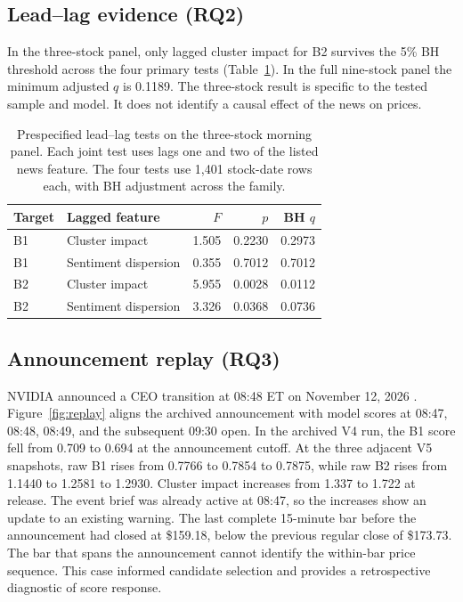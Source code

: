 \documentclass{article}
\begin{document}
\subsection{Lead--lag evidence (RQ2)}

In the three-stock panel, only lagged cluster impact for B2 survives the 5\% BH threshold across the four primary tests (Table~\ref{tab:granger}). In the full nine-stock panel the minimum adjusted $q$ is 0.1189. The three-stock result is specific to the tested sample and model. It does not identify a causal effect of the news on prices.

\begin{table}[htbp]
 \caption{Prespecified lead--lag tests on the three-stock morning panel. Each joint test uses lags one and two of the listed news feature. The four tests use 1,401 stock-date rows each, with BH adjustment across the family.}
 \label{tab:granger}
 \centering
 \begin{tabular}{@{}llrrr@{}}
 \toprule
 Target & Lagged feature & $F$ & $p$ & BH $q$ \\
 \midrule
 B1 & Cluster impact & 1.505 & 0.2230 & 0.2973 \\
 B1 & Sentiment dispersion & 0.355 & 0.7012 & 0.7012 \\
 B2 & Cluster impact & 5.955 & 0.0028 & 0.0112 \\
 B2 & Sentiment dispersion & 3.326 & 0.0368 & 0.0736 \\
 \bottomrule
 \end{tabular}
\end{table}

\subsection{Announcement replay (RQ3)}

NVIDIA announced a CEO transition at 08:48 ET on November 12, 2026 \citep{nvidia2026transition}. Figure~\ref{fig:replay} aligns the archived announcement with model scores at 08:47, 08:48, 08:49, and the subsequent 09:30 open. In the archived V4 run, the B1 score fell from 0.709 to 0.694 at the announcement cutoff. At the three adjacent V5 snapshots, raw B1 rises from 0.7766 to 0.7854 to 0.7875, while raw B2 rises from 1.1440 to 1.2581 to 1.2930. Cluster impact increases from 1.337 to 1.722 at release. The event brief was already active at 08:47, so the increases show an update to an existing warning. The last complete 15-minute bar before the announcement had closed at \$159.18, below the previous regular close of \$173.73. The bar that spans the announcement cannot identify the within-bar price sequence. This case informed candidate selection and provides a retrospective diagnostic of score response.
\end{document}
